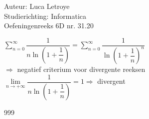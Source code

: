 \documentclass[a4paper]{article}
\begin{document}
  
\noindent \large Auteur: Luca Letroye \\
\noindent \large Studierichting: Informatica\\
\noindent \large Oefeningenreeks 6D nr. 31.20

\medskip
\normalsize

$ \displaystyle\sum_{n=0}^{\infty} \dfrac{1}{n\ln\left(1+\dfrac{1}{n}\right)} = \displaystyle\sum_{n=0}^{\infty} \dfrac{1}{\ln\left(1+\dfrac{1}{n}\right)^n}$\\

$\Rightarrow $ negatief criterium voor divergente reeksen\\

$\lim\limits_{n\rightarrow +\infty} \dfrac{1}{n\ln\left(1+\dfrac{1}{n}\right)} = 1 \Rightarrow$ divergent\\










\begin{thebibliography}{999}
\end{thebibliography}
\end{document}
